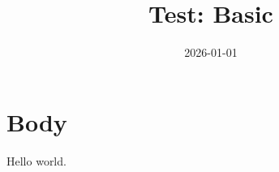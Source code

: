 \documentclass{article}
\title{Test: Basic}
\date{2026-01-01}
\begin{document}
\maketitle
\section{Body}
Hello world.
\end{document}
